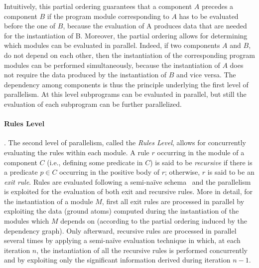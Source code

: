 \documentclass[preprint]{tlp}
\newcommand{\nop}[1]{}
\begin{document}
Intuitively, this partial ordering guarantees that a component $A$
precedes a component $B$ if the program module corresponding to $A$
has to be evaluated before the one of $B$, because the evaluation of
A produces data that are needed for the instantiation of B.
Moreover, the partial ordering allows for determining which modules
can be evaluated in parallel. Indeed, if two components $A$ and $B$,
do not depend on each other, then the instantiation of the
corresponding program modules can be performed simultaneously,
because the instantiation of $A$ does not require the data produced
by the instantiation of $B$ and vice versa.
The dependency among components is thus the principle underlying the
first level of parallelism. At this level subprograms can be
evaluated in parallel, but still the evaluation of each subprogram
can be further parallelized.

\paragraph{Rules Level}\cite{cali-etal-2008-joacil}.
The second level of parallelism, called the {\em Rules Level},
allows for concurrently evaluating the rules within each module. A
rule $r$ occurring in the module of a component $C$ (i.e.,
defining some predicate in $C$) is said to be {\em recursive} if
there is a predicate $p \in C$ occurring in the positive body of
$r$; otherwise, $r$ is said to be an {\em exit rule}. Rules are
evaluated following a semi-na\"ive schema~\cite{ullm-89} and the
parallelism is exploited for the evaluation of both exit and
recursive rules.
More in detail, for the instantiation of a module $M$, first all
exit rules are processed in parallel by exploiting the data (ground
atoms) computed during the instantiation of the modules which $M$
depends on (according to the partial ordering induced by the
dependency graph).
Only afterward, recursive rules are processed in parallel several
times by applying a semi-na\"ive evaluation technique in which, at
each iteration $n$, the instantiation of all the recursive rules is
performed concurrently and by exploiting only the significant
information derived during iteration $n-1$.
\nop{ This is done by
partitioning significant atoms into three sets: $\Delta S$, $S$ and
$NS$. $NS$ is filled with atoms computed during current iteration
(say $n$); $\Delta S$ contains atoms computed during previous
iteration (say $n-1$); and, $S$ contains the ones previously
computed (up to iteration $n-2$).

Initially, $\Delta S$ and $NS$ are empty; while $S$ contains all the
information previously derived in the instantiation process. At the
beginning of each new iteration, $NS$ is assigned to $\Delta S$,
i.e. the new information derived during iteration $n$ is considered
as significant information for iteration $n+1$. Then, the recursive
rules are processed simultaneously and each of them uses the
information contained in the set $\Delta S$; at the end of the
iteration, when the evaluation of all rules is terminated, the set
$\Delta S$ is added to the set $S$ (since it has already been
exploited).  The evaluation stops whenever no new information has
been derived (i.e. $NS=\emptyset$).
}
\end{document}
